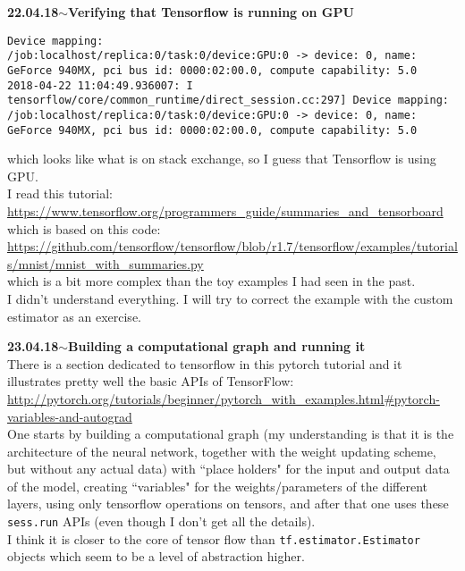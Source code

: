 \documentclass[11pt,a4paper]{article}
\newenvironment{loggentry}[2]%
{\noindent\textbf{#1}\hspace{1cm}$\mathbf{\sim}$\text{ }\textbf{#2}\\}{\vspace{0.5cm}}
\begin{document}
\begin{loggentry}{22.04.18}{Verifying that Tensorflow is running on GPU}
\begin{verbatim}
Device mapping:
/job:localhost/replica:0/task:0/device:GPU:0 -> device: 0, name: GeForce 940MX, pci bus id: 0000:02:00.0, compute capability: 5.0
2018-04-22 11:04:49.936007: I tensorflow/core/common_runtime/direct_session.cc:297] Device mapping:
/job:localhost/replica:0/task:0/device:GPU:0 -> device: 0, name: GeForce 940MX, pci bus id: 0000:02:00.0, compute capability: 5.0
\end{verbatim}
which looks like what is on stack exchange, so I guess that Tensorflow is using GPU.\\

I read this tutorial:\\
\url{https://www.tensorflow.org/programmers_guide/summaries_and_tensorboard}\\
which is based on this code:\\
\url{https://github.com/tensorflow/tensorflow/blob/r1.7/tensorflow/examples/tutorials/mnist/mnist_with_summaries.py}\\
which is a bit more complex than the toy examples I had seen in the past.\\
I didn't understand everything. I will try to correct the example with the custom estimator as an exercise.
\end{loggentry}

\begin{loggentry}{23.04.18}{Building a computational graph and running it}
There is a section dedicated to tensorflow in this pytorch tutorial and it illustrates pretty well the basic APIs of TensorFlow:\\
\url{http://pytorch.org/tutorials/beginner/pytorch_with_examples.html#pytorch-variables-and-autograd}\\
One starts by building a computational graph (my understanding is that it is the architecture of the neural network, together with the weight updating scheme, but without any actual data) with ``place holders" for the input and output data of the model, creating ``variables" for the weights/parameters of the different layers, using only tensorflow operations on tensors, and after that one uses these \texttt{sess.run} APIs (even though I don't get all the details).\\
I think it is closer to the core of tensor flow than \texttt{tf.estimator.Estimator} objects which seem to be a level of abstraction higher.
\end{loggentry}
\end{document}
